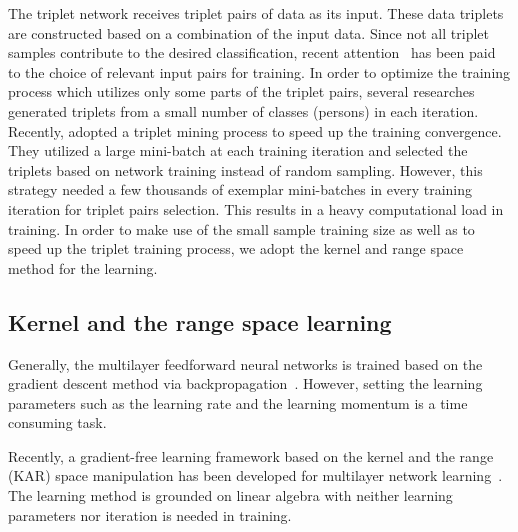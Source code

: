 \documentclass{sig-alternate-05-2015}
\begin{document}
The triplet network receives triplet pairs of data as its input. These data triplets are constructed based on a combination of the input data. Since not all triplet samples contribute to the desired classification, recent attention~\cite{schroff2015facenet} has been paid to the choice of relevant input pairs for training. In order to optimize the training process which utilizes only some parts of the triplet pairs, several researches~\cite{cheng2016person,ding2015deep,wang2016joint} generated triplets from a small number of classes (persons) in each iteration. Recently, \cite{schroff2015facenet} adopted a triplet mining process to speed up the training convergence. They utilized a large mini-batch at each training iteration and selected the triplets based on network training instead of random sampling. However, this strategy needed a few thousands of exemplar mini-batches in every training iteration for triplet pairs selection. This results in a heavy computational load in training. In order to make use of the small sample training size as well as to speed up the triplet training process, we adopt the kernel and range space method for the learning.

\subsection{Kernel and the range space learning}\label{kar}

Generally, the multilayer feedforward neural networks is trained based on the gradient descent method via backpropagation~\cite{goodfellow2016deep}.
However, setting the learning parameters such as the learning rate and the learning momentum is a time consuming task.

Recently, a gradient-free learning framework based on the kernel and the range (KAR) space manipulation has been developed for multilayer network learning~\cite{toh100,toh2018learning,toh2018analytic,toh2018gradient}.
The learning method is grounded on linear algebra with neither learning parameters nor iteration is needed in training.
\end{document}
